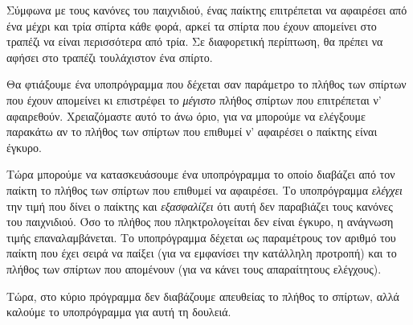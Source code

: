 \documentclass[a4paper,11pt,oneside]{book}
\begin{document}
Σύμφωνα με τους κανόνες του παιχνιδιού, ένας παίκτης επιτρέπεται να αφαιρέσει από ένα μέχρι και τρία σπίρτα κάθε φορά, αρκεί τα σπίρτα που έχουν απομείνει στο τραπέζι να είναι περισσότερα από τρία. Σε διαφορετική περίπτωση, θα πρέπει να αφήσει στο τραπέζι τουλάχιστον ένα σπίρτο. 

Θα φτιάξουμε ένα υποπρόγραμμα που δέχεται σαν παράμετρο το πλήθος των σπίρτων που έχουν απομείνει κι επιστρέφει το \emph{μέγιστο} πλήθος σπίρτων που επιτρέπεται ν' αφαιρεθούν. Χρειαζόμαστε αυτό το άνω όριο, για να μπορούμε να ελέγξουμε παρακάτω αν το πλήθος των σπίρτων που επιθυμεί ν' αφαιρέσει ο παίκτης είναι έγκυρο. 


Τώρα μπορούμε να κατασκευάσουμε ένα υποπρόγραμμα το οποίο διαβάζει από τον παίκτη το πλήθος των σπίρτων που επιθυμεί να αφαιρέσει. Το υποπρόγραμμα \emph{ελέγχει} την τιμή που δίνει ο παίκτης και \emph{εξασφαλίζει} ότι αυτή δεν παραβιάζει τους κανόνες του παιχνιδιού. Όσο το πλήθος που πληκτρολογείται δεν είναι έγκυρο, η ανάγνωση τιμής επαναλαμβάνεται. Το υποπρόγραμμα δέχεται ως παραμέτρους τον αριθμό του παίκτη που έχει σειρά να παίξει (για να εμφανίσει την κατάλληλη προτροπή) και το πλήθος των σπίρτων που απομένουν (για να κάνει τους απαραίτητους ελέγχους).


Τώρα, στο κύριο πρόγραμμα δεν διαβάζουμε απευθείας το πλήθος το σπίρτων, αλλά καλούμε το υποπρόγραμμα για αυτή τη δουλειά. 





\end{document}
